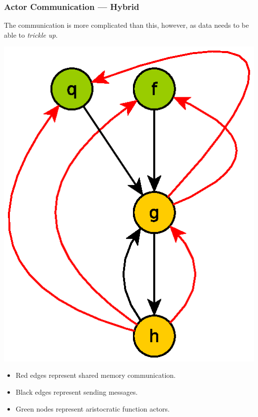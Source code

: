 \documentclass{beamer}
\begin{document}
\begin{frame}[fragile]
  \frametitle{Actor Communication --- Hybrid}

  The communication is more complicated than this, however, as data
  needs to be able to \emph{trickle up}.

  \begin{multicols}{2}
    \begin{center}
      \includegraphics[width=0.7\linewidth]{media/commtypes.eps}
    \end{center}

    \begin{itemize}
      \item {\color{red} Red edges} represent shared memory
        communication.
      \item  Black edges represent sending messages.
      \item {\color{green} Green nodes} represent aristocratic function
      actors.
    \end{itemize}
  \end{multicols}
\end{frame}
\end{document}
